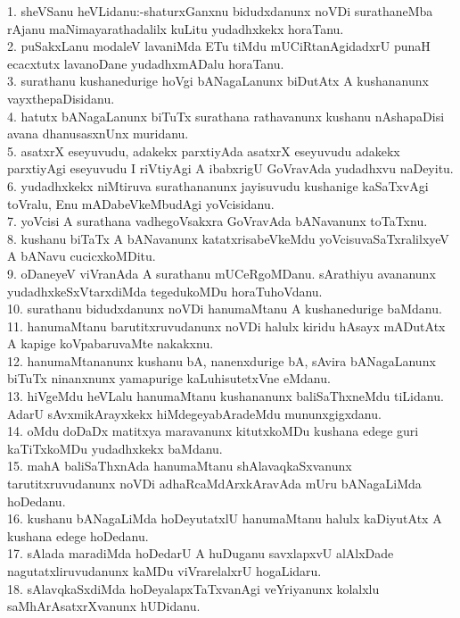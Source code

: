 \documentclass{article}
\begin{document}
1. sheVSanu heVLidanu:-shaturxGanxnu bidudxdanunx noVDi surathaneMba rAjanu maNimayarathadalilx kuLitu yudadhxkekx horaTanu.\\
2. puSakxLanu modaleV lavaniMda ETu tiMdu mUCiRtanAgidadxrU punaH ecacxtutx lavanoDane yudadhxmADalu horaTanu.\\
3. surathanu kushanedurige hoVgi bANagaLanunx biDutAtx A kushananunx vayxthepaDisidanu.\\
4. hatutx bANagaLanunx biTuTx surathana rathavanunx kushanu nAshapaDisi avana dhanusasxnUnx muridanu.\\
5. asatxrX eseyuvudu, adakekx parxtiyAda asatxrX eseyuvudu adakekx parxtiyAgi eseyuvudu I riVtiyAgi A ibabxrigU GoVravAda yudadhxvu naDeyitu.\\
6. yudadhxkekx niMtiruva surathananunx jayisuvudu kushanige kaSaTxvAgi toVralu, Enu mADabeVkeMbudAgi yoVcisidanu.\\
7. yoVcisi A surathana vadhegoVsakxra GoVravAda bANavanunx toTaTxnu.\\
8. kushanu biTaTx A bANavanunx katatxrisabeVkeMdu yoVcisuvaSaTxralilxyeV A bANavu cucicxkoMDitu.\\
9. oDaneyeV viVranAda A surathanu mUCeRgoMDanu. sArathiyu avananunx yudadhxkeSxVtarxdiMda tegedukoMDu horaTuhoVdanu.\\
10. surathanu bidudxdanunx noVDi hanumaMtanu A kushanedurige baMdanu.\\
11. hanumaMtanu barutitxruvudanunx noVDi halulx kiridu hAsayx mADutAtx A kapige koVpabaruvaMte nakakxnu.\\
12. hanumaMtananunx kushanu bA, nanenxdurige bA, sAvira bANagaLanunx biTuTx ninanxnunx yamapurige kaLuhisutetxVne eMdanu.\\
13. hiVgeMdu heVLalu hanumaMtanu kushananunx baliSaThxneMdu tiLidanu. AdarU sAvxmikArayxkekx hiMdegeyabAradeMdu mununxgigxdanu.\\
14. oMdu doDaDx matitxya maravanunx kitutxkoMDu kushana edege guri kaTiTxkoMDu yudadhxkekx baMdanu.\\
15. mahA baliSaThxnAda hanumaMtanu shAlavaqkaSxvanunx tarutitxruvudanunx noVDi adhaRcaMdArxkAravAda mUru bANagaLiMda hoDedanu.\\
16. kushanu bANagaLiMda hoDeyutatxlU hanumaMtanu halulx kaDiyutAtx A kushana edege hoDedanu.\\
17. sAlada maradiMda hoDedarU A huDuganu savxlapxvU alAlxDade nagutatxliruvudanunx kaMDu viVrarelalxrU hogaLidaru.\\
18. sAlavqkaSxdiMda hoDeyalapxTaTxvanAgi veYriyanunx kolalxlu saMhArAsatxrXvanunx hUDidanu.\\
\end{document}

